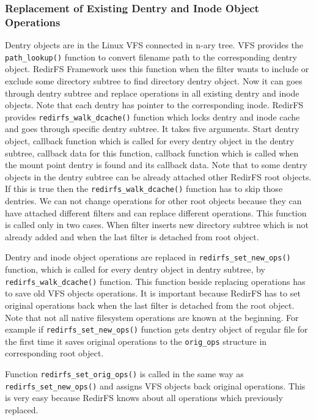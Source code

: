 \subsubsection{Replacement of Existing Dentry and Inode Object Operations}
Dentry objects are in the Linux VFS connected in n-ary tree. VFS provides the
\texttt{path\_lookup()} function to convert filename path to the corresponding dentry
object. RedirFS Framework uses this function when the filter wants to include or exclude
some directory subtree to find directory dentry object. Now it can goes through dentry
subtree and replace operations in all existing dentry and inode objects. Note that
each dentry has pointer to the corresponding inode. RedirFS provides
\texttt{redirfs\_walk\_dcache()} function which locks dentry and inode cache and goes
through specific dentry subtree. It takes five arguments. Start dentry object,
callback function which is called for every dentry object in the dentry subtree,
callback data for this function, callback function which is called when the mount
point dentry is found and its callback data. Note that to some dentry objects in the
dentry subtree can be already attached other RedirFS root objects. If this is true
then the \texttt{redirfs\_walk\_dcache()} function has to skip those dentries. We can
not change operations for other root objects because they can have attached different
filters and can replace different operations. This function is called only in two cases.
When filter inserts new directory subtree which is not already added and when the last
filter is detached from root object.

Dentry and inode object operations are replaced in \texttt{redirfs\_set\_new\_ops()}
function, which is called for every dentry object in dentry subtree, by
\texttt{redirfs\_walk\_dcache()} function. This function beside replacing operations
has to save old VFS objects operations. It is important because RedirFS has to set
original operations back when the last filter is detached from the root object. Note that
not all native filesystem operations are known at the beginning. For example if
\texttt{redirfs\_set\_new\_ops()} function gets dentry object of regular file for the
first time it saves original operations to the \texttt{orig\_ops} structure in
corresponding root object.

Function \texttt{redirfs\_set\_orig\_ops()} is called in the same way as
\texttt{redirfs\_set\_new\_ops()} and assigns VFS objects back original operations.
This is very easy because RedirFS knows about all operations which previously
replaced.
 
